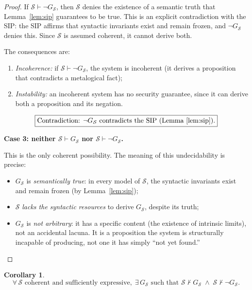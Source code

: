 \documentclass[11pt]{article}
\newtheorem{corollary}[theorem]{Corollary}
\begin{document}
\begin{proof}
If $\mathcal{S} \vdash \neg G_{\mathcal{S}}$, then $\mathcal{S}$ denies
the existence of a semantic truth that Lemma~\ref{lem:sip} guarantees to
be true. This is an explicit contradiction with the SIP: the SIP affirms
that syntactic invariants exist and remain frozen, and $\neg
G_{\mathcal{S}}$ denies this. Since $\mathcal{S}$ is assumed coherent,
it cannot derive both.

The consequences are:
\begin{enumerate}
  \item \emph{Incoherence:} if $\mathcal{S} \vdash \neg G_{\mathcal{S}}$,
        the system is incoherent (it derives a proposition that
        contradicts a metalogical fact);
  \item \emph{Instability:} an incoherent system has no security
        guarantee, since it can derive both a proposition and its
        negation.
\end{enumerate}

\[
  \boxed{\text{Contradiction: } \neg G_{\mathcal{S}}
  \text{ contradicts the SIP (Lemma~\ref{lem:sip}).}}
\]

\medskip
\textbf{Case 3: neither $\mathcal{S} \vdash G_{\mathcal{S}}$ nor
$\mathcal{S} \vdash \neg G_{\mathcal{S}}$.}

This is the only coherent possibility. The meaning of this
undecidability is precise:
\begin{itemize}
  \item $G_{\mathcal{S}}$ is \emph{semantically true}: in every model of
        $\mathcal{S}$, the syntactic invariants exist and remain frozen
        (by Lemma~\ref{lem:sip});
  \item $\mathcal{S}$ \emph{lacks the syntactic resources} to derive
        $G_{\mathcal{S}}$, despite its truth;
  \item $G_{\mathcal{S}}$ is \emph{not arbitrary}: it has a specific
        content (the existence of intrinsic limits), not an accidental
        lacuna. It is a proposition the system is structurally incapable
        of producing, not one it has simply ``not yet found.''
\end{itemize}
\end{proof}

\begin{corollary}
\label{cor:undecidability}
\[
  \boxed{
  \forall\,\mathcal{S} \text{ coherent and sufficiently expressive},\;
  \exists\, G_{\mathcal{S}} \text{ such that }
  \mathcal{S} \not\vdash G_{\mathcal{S}}
  \;\land\;
  \mathcal{S} \not\vdash \neg G_{\mathcal{S}}.
  }
\]
\end{corollary}
\end{document}
